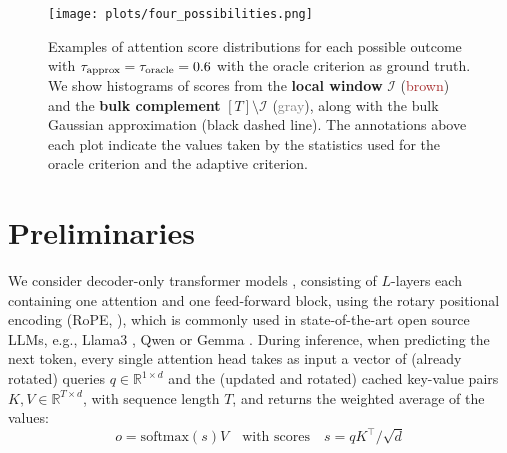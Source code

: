 






\begin{figure*}
    \centering
    \texttt{[image: plots/four\_possibilities.png]}
    \caption{
        Examples of attention score distributions for each possible outcome with 
        $\tau_{\text{approx}} = \tau_{\text{oracle}} = 0.6$ with the oracle criterion as ground truth. 
        We show histograms of scores from the \textbf{local window} $\mathcal{I}$ (\textcolor{brown}{brown}) 
        and the \textbf{bulk complement} $[T] \setminus \mathcal{I}$ (\textcolor{gray}{gray}), 
        along with the bulk Gaussian approximation (black dashed line). 
        The annotations above each plot indicate the values taken by the statistics used for the oracle criterion 
        and the adaptive criterion.
    }
    \label{fig:scores}
\end{figure*}

\section{Preliminaries}
\label{sec:setting}
 We consider decoder-only transformer models \citep{vaswani2017attention},  consisting of $L$-layers each containing one attention  and one feed-forward block, using the rotary positional encoding (RoPE, \citet{su2024roformer}),  which is commonly used in state-of-the-art open source LLMs, e.g., Llama3 \citep{dubey2024llama}, Qwen \citep{bai2023qwen} or Gemma \citep{team2024gemma}. 
During inference, when predicting the next token, every single attention head  takes as input a vector of (already rotated) queries $q\in \mathbb R^{1\times d}$  and the (updated and rotated) cached key-value pairs $K, V \in \mathbb R^{T\times d}$, with sequence length $T$, and returns the weighted average of the values:
\begin{equation}
\label{eq:softmax}
    o = \text{softmax}(s) V \quad \text{with scores}\quad s= q K^\top/ \sqrt{d}
\end{equation}


